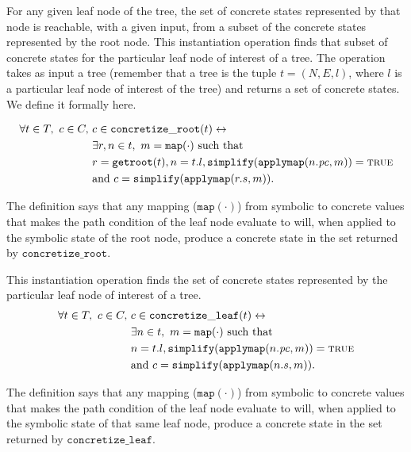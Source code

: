 \begin{mydefinition}
  \label{def:concroot}
  
  For any given leaf node of the
  tree, the set of concrete states represented by that node is reachable, with a
  given input, from a subset of the concrete states represented by the root
  node. This instantiation operation finds that subset of concrete states
  for the particular leaf node of interest of a tree. The operation takes as
  input a tree (remember that a tree is
  the tuple $t = (N, E, l)$, where $l$ is a particular leaf node of interest of
  the tree) and returns
  a set of concrete states. We define it formally here.

  \begin{align*}
\forall t \in T,~ c \in C,~& c \in
\mathtt{concretize\_root}(t) \leftrightarrow \\
&\exists r,n \in t,~ m = \mathtt{map(\cdot)} \mathrm{~such~that}\\
&r = \mathtt{getroot}(t), n = t.l,
\mathtt{simplify}(\mathtt{applymap} (n.\mathit{pc}, m)) = \mathtt{\textsc{true}} \\
&\mathrm{and~}  c = \mathtt{simplify}(\mathtt{applymap}(r.s, m)).
    \end{align*}
\end{mydefinition}

The definition says that any mapping ($\mathtt{map(\cdot)}$) from symbolic to concrete values that makes
the path condition of the leaf node evaluate to \texttrue{} will, when applied to
the symbolic state of the root node, produce a concrete state in the set returned
by $\mathtt{concretize\_root}$.

\begin{mydefinition}
  \label{def:concleaf}

  This instantiation operation finds the set of concrete states represented by
  the particular leaf node of interest of a tree.
  \begin{align*}
\forall t \in T,~ c \in C,~& c \in
\mathtt{concretize\_leaf}(t) \leftrightarrow \\
&\exists n \in t,~ m = \mathtt{map(\cdot)} \mathrm{~such~that}\\
&n = t.l,
\mathtt{simplify}(\mathtt{applymap} (n.\mathit{pc}, m)) = \mathtt{\textsc{true}} \\
&\mathrm{and~}  c = \mathtt{simplify}(\mathtt{applymap}(n.s, m)).
    \end{align*}

   The definition says that any mapping ($\mathtt{map(\cdot)}$) from symbolic to concrete values that makes
the path condition of the leaf node evaluate to \texttrue{} will, when applied to
the symbolic state of that same leaf node, produce a concrete state in the set returned
by $\mathtt{concretize\_leaf}$.


\end{mydefinition}


